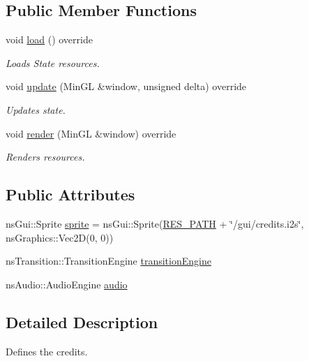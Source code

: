 \subsection*{Public Member Functions}
\begin{DoxyCompactItemize}
\item 
void \hyperlink{class_credit_state_a32ec8ae5c12ee636cfd2b949b8e980e1}{load} () override
\begin{DoxyCompactList}\small\item\em Loads State resources. \end{DoxyCompactList}\item 
void \hyperlink{class_credit_state_a52a92d650fce22fa08b37359c3a5aa64}{update} (Min\+GL \&window, unsigned delta) override
\begin{DoxyCompactList}\small\item\em Updates state. \end{DoxyCompactList}\item 
void \hyperlink{class_credit_state_aa4ba316fca29d0e79ee70891e373a060}{render} (Min\+GL \&window) override
\begin{DoxyCompactList}\small\item\em Renders resources. \end{DoxyCompactList}\end{DoxyCompactItemize}
\subsection*{Public Attributes}
\begin{DoxyCompactItemize}
\item 
ns\+Gui\+::\+Sprite \hyperlink{class_credit_state_a10ae436f8c1ca5d87cc960ada3cadb18}{sprite} = ns\+Gui\+::\+Sprite(\hyperlink{definitions_8h_a793644bd88146828177a2a4f57e3bf01}{R\+E\+S\+\_\+\+P\+A\+TH} + \char`\"{}/gui/credits.\+i2s\char`\"{}, ns\+Graphics\+::\+Vec2D(0, 0))
\item 
ns\+Transition\+::\+Transition\+Engine \hyperlink{class_credit_state_a12c76114d83f1788b356c0cbbc74bcaf}{transition\+Engine}
\item 
ns\+Audio\+::\+Audio\+Engine \hyperlink{class_credit_state_a8dd128ec1e8d3b8da0da5bd0be38c96d}{audio}
\end{DoxyCompactItemize}


\subsection{Detailed Description}
Defines the credits. 

